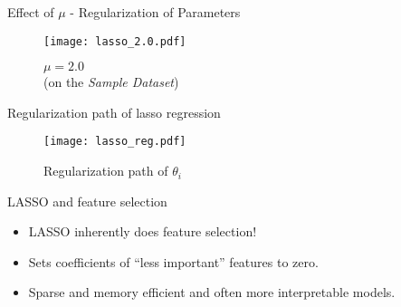 \documentclass{beamer}
\begin{document}
\begin{frame}{Effect of $\mu$ - Regularization of Parameters}
\vspace{0.4cm}
\begin{figure}\texttt{[image: lasso\_2.0.pdf]}\caption{$\mu = 2.0$\\(on the \emph{Sample Dataset})}
\end{figure}
\end{frame}

{
	
}


%
%
%
%
%
%
%
%
%
%

\begin{frame}{Regularization path of lasso regression}
\begin{figure}
    \centering
    \texttt{[image: lasso\_reg.pdf]}
    \caption{Regularization path of $\theta_{i}$}
    \label{fig:my_label}
\end{figure}

\end{frame}


\begin{frame}{LASSO and feature selection}
\begin{itemize}[<+->]
	\item LASSO inherently does feature selection!
	\item Sets coefficients of ``less important'' features to zero.
	\item Sparse and memory efficient and often more interpretable models.
\end{itemize}
\end{frame}
\end{document}
